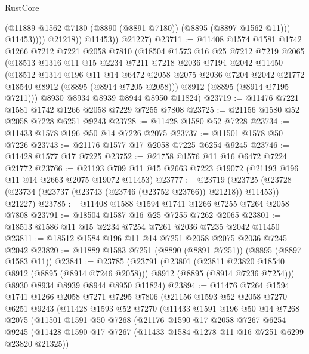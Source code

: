 \begin{lexlean}{RustCore}
\begin{coremodule}
                      (@11889 @1562 @7180 (@8890 (@8891 @7180)) (@8895 (@8897 @1562 @11)))
                      @11453))))
              @21218))
          @11453))
      @21227)
@23711 := @11408
    @1574
    @1581
    @1742
    @1266
    @7212
    @7221
    @2058
    @7810
    (@18504
      @1573
      @16
      @25
      @7212
      @7219
      @2065
      (@18513
        @1316
        @11
        @15
        @2234
        @7211
        @7218
        @2036
        @7194
        @2042
        @11450
        (@18512
          @1314
          @196
          @11
          @14
          @6472
          @2058
          @2075
          @2036
          @7204
          @2042
          @21772
          @18540
          @8912
          (@8895 (@8914 @7205 @2058)))
        @8912
        (@8895 (@8914 @7195 @7211)))
      @8930
      @8934
      @8939
      @8944
      @8950
      @11824)
@23719 := @11476 @7221 @1581 @1742 @1266 @2058 @7229 @7255 @7808
@23725 := @21156 @1580 @52 @2058 @7228 @6251 @9243
@23728 := @11428 @1580 @52 @7228
@23734 := @11433 @1578 @196 @50 @14 @7226 @2075
@23737 := @11501 @1578 @50 @7226
@23743 := @21176 @1577 @17 @2058 @7225 @6254 @9245
@23746 := @11428 @1577 @17 @7225
@23752 := @21758 @1576 @11 @16 @6472 @7224 @21772
@23766 := @21193 @709 @11 @15 @2663 @7223 @19072 (@21193 @196 @11 @14 @2663 @2075 @19072 @11453)
@23777 := @23719
    (@23725 (@23728 (@23734 (@23737 (@23743 (@23746 (@23752 @23766)) @21218)) @11453)) @21227)
@23785 := @11408 @1588 @1594 @1741 @1266 @7255 @7264 @2058 @7808
@23791 := @18504 @1587 @16 @25 @7255 @7262 @2065
@23801 := @18513 @1586 @11 @15 @2234 @7254 @7261 @2036 @7235 @2042 @11450
@23811 := @18512 @1584 @196 @11 @14 @7251 @2058 @2075 @2036 @7245 @2042
@23820 := @11889 @1583 @7251 (@8890 (@8891 @7251)) (@8895 (@8897 @1583 @11))
@23841 := @23785
    (@23791
      (@23801
        (@23811 @23820 @18540 @8912 (@8895 (@8914 @7246 @2058)))
        @8912
        (@8895 (@8914 @7236 @7254)))
      @8930
      @8934
      @8939
      @8944
      @8950
      @11824)
@23894 := @11476
    @7264
    @1594
    @1741
    @1266
    @2058
    @7271
    @7295
    @7806
    (@21156
      @1593
      @52
      @2058
      @7270
      @6251
      @9243
      (@11428
        @1593
        @52
        @7270
        (@11433
          @1591
          @196
          @50
          @14
          @7268
          @2075
          (@11501
            @1591
            @50
            @7268
            (@21176
              @1590
              @17
              @2058
              @7267
              @6254
              @9245
              (@11428 @1590 @17 @7267 (@11433 @1584 @1278 @11 @16 @7251 @6299 @23820 @21325))

\end{coremodule}
\end{lexlean}
